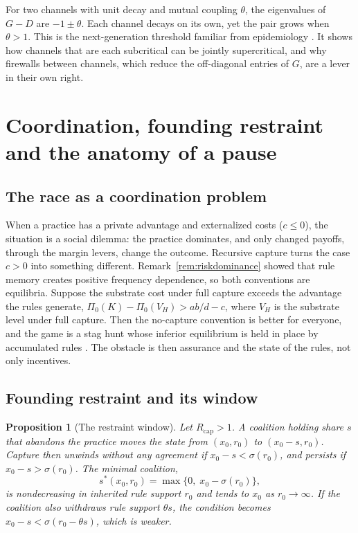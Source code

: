 \documentclass[11pt]{article}
\theoremstyle{plain}
\newtheorem{proposition}{Proposition}
\theoremstyle{definition}
\newcommand{\Rcap}{R_{\mathrm{cap}}}
\begin{document}
For two channels with unit decay and mutual coupling $\theta$, the eigenvalues of $G-D$ are $-1\pm\theta$. Each channel decays on its own, yet the pair grows when $\theta>1$. This is the next-generation threshold familiar from epidemiology \citep{vandendriessche2002}. It shows how channels that are each subcritical can be jointly supercritical, and why firewalls between channels, which reduce the off-diagonal entries of $G$, are a lever in their own right.

\section{Coordination, founding restraint and the anatomy of a pause}\label{sec:pause}

\subsection{The race as a coordination problem}

When a practice has a private advantage and externalized costs ($c\le0$), the situation is a social dilemma: the practice dominates, and only changed payoffs, through the margin levers, change the outcome. Recursive capture turns the case $c>0$ into something different. Remark~\ref{rem:riskdominance} showed that rule memory creates positive frequency dependence, so both conventions are equilibria. Suppose the substrate cost under full capture exceeds the advantage the rules generate, $\Pi_0(K)-\Pi_0(V_H)>ab/d-c$, where $V_H$ is the substrate level under full capture. Then the no-capture convention is better for everyone, and the game is a stag hunt whose inferior equilibrium is held in place by accumulated rules \citep{skyrms2004}. The obstacle is then assurance and the state of the rules, not only incentives.

\subsection{Founding restraint and its window}

\begin{proposition}[The restraint window]\label{prop:restraint}
Let $\Rcap>1$. A coalition holding share $s$ that abandons the practice moves the state from $(x_0,r_0)$ to $(x_0-s,r_0)$. Capture then unwinds without any agreement if $x_0-s<\sigma(r_0)$, and persists if $x_0-s>\sigma(r_0)$. The minimal coalition,
\[
s^\ast(x_0,r_0)=\max\{0,\;x_0-\sigma(r_0)\},
\]
is nondecreasing in inherited rule support $r_0$ and tends to $x_0$ as $r_0\to\infty$. If the coalition also withdraws rule support $\theta s$, the condition becomes $x_0-s<\sigma(r_0-\theta s)$, which is weaker.
\end{proposition}
\end{document}
